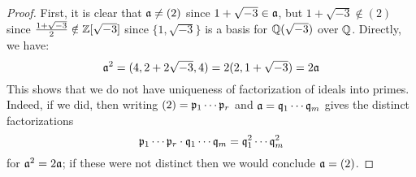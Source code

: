 \begin{proof}
	First, it is clear that $\mathfrak{a} \neq (2)$ since $1+\sqrt{-3} \in \mathfrak{a}$, but $1+\sqrt{-3} \notin (2)$ since $\frac{1+\sqrt{-3}}{2} \notin \mathbb{Z}[\sqrt{-3}]$ since $\{1,\sqrt{-3}\}$ is a basis for $\mathbb{Q}(\sqrt{-3})$ over $\mathbb{Q}$. Directly, we have:
	\[ \mathfrak{a}^2 = (4,2+2\sqrt{-3},4) = 2(2,1+\sqrt{-3}) = 2\mathfrak{a} \]
	This shows that we do not have uniqueness of factorization of ideals into primes. Indeed, if we did, then writing $(2) = \mathfrak{p}_1 \cdots \mathfrak{p}_r$ and $\mathfrak{a} = \mathfrak{q}_1 \cdots \mathfrak{q}_m$ gives the distinct factorizations
	\[ \mathfrak{p}_1 \cdots \mathfrak{p}_r \cdot \mathfrak{q}_1 \cdots \mathfrak{q}_m = \mathfrak{q}_1^2 \cdots \mathfrak{q}_m^2 \]
	for $\mathfrak{a}^2 = 2\mathfrak{a}$; if these were not distinct then we would conclude $\mathfrak{a} = (2)$.
\end{proof}
